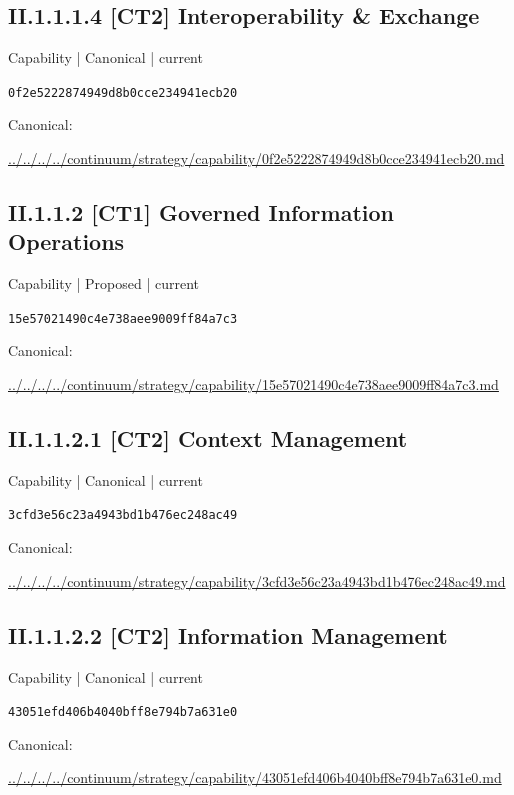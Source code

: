 \documentclass[10pt,a4paper]{article}
\begin{document}
\subsection*{II.1.1.1.4 [CT2] Interoperability \& Exchange}
{\small Capability | Canonical | current}\par
\texttt{0f2e5222874949d8b0cce234941ecb20}\par
Canonical: \par
{\footnotesize\url{../../../../continuum/strategy/capability/0f2e5222874949d8b0cce234941ecb20.md}}\par
\subsection*{II.1.1.2 [CT1] Governed Information Operations}
{\small Capability | Proposed | current}\par
\texttt{15e57021490c4e738aee9009ff84a7c3}\par
Canonical: \par
{\footnotesize\url{../../../../continuum/strategy/capability/15e57021490c4e738aee9009ff84a7c3.md}}\par
\subsection*{II.1.1.2.1 [CT2] Context Management}
{\small Capability | Canonical | current}\par
\texttt{3cfd3e56c23a4943bd1b476ec248ac49}\par
Canonical: \par
{\footnotesize\url{../../../../continuum/strategy/capability/3cfd3e56c23a4943bd1b476ec248ac49.md}}\par
\subsection*{II.1.1.2.2 [CT2] Information Management}
{\small Capability | Canonical | current}\par
\texttt{43051efd406b4040bff8e794b7a631e0}\par
Canonical: \par
{\footnotesize\url{../../../../continuum/strategy/capability/43051efd406b4040bff8e794b7a631e0.md}}\par
\end{document}
